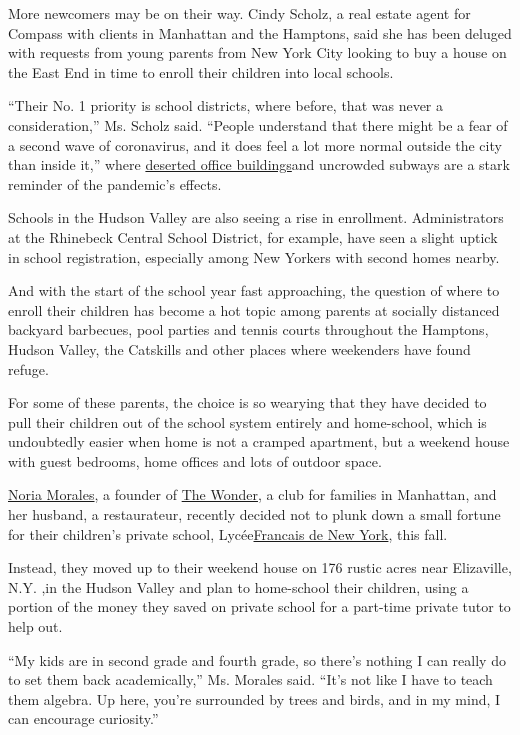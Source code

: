 More newcomers may be on their way. Cindy Scholz, a real estate agent
for Compass with clients in Manhattan and the Hamptons, said she has
been deluged with requests from young parents from New York City looking
to buy a house on the East End in time to enroll their children into
local schools.

``Their No. 1 priority is school districts, where before, that was never
a consideration,'' Ms. Scholz said. ``People understand that there might
be a fear of a second wave of coronavirus, and it does feel a lot more
normal outside the city than inside it,'' where
\href{https://www.nytimes3xbfgragh.onion/2020/07/26/nyregion/nyc-coronavirus-time-life-building.html}{deserted
office buildings}and uncrowded subways are a stark reminder of the
pandemic's effects.

Schools in the Hudson Valley are also seeing a rise in enrollment.
Administrators at the Rhinebeck Central School District, for example,
have seen a slight uptick in school registration, especially among New
Yorkers with second homes nearby.

And with the start of the school year fast approaching, the question of
where to enroll their children has become a hot topic among parents at
socially distanced backyard barbecues, pool parties and tennis courts
throughout the Hamptons, Hudson Valley, the Catskills and other places
where weekenders have found refuge.

For some of these parents, the choice is so wearying that they have
decided to pull their children out of the school system entirely and
home-school, which is undoubtedly easier when home is not a cramped
apartment, but a weekend house with guest bedrooms, home offices and
lots of outdoor space.

\href{https://www.glamour.com/story/noria-morales-what-it-costs-to-be-me}{Noria
Morales}, a founder of \href{https://www.thewonder.us/}{The Wonder}, a
club for families in Manhattan, and her husband, a restaurateur,
recently decided not to plunk down a small fortune for their children's
private school, Lycée\href{https://www.lfny.org/}{Francais de New York},
this fall.

Instead, they moved up to their weekend house on 176 rustic acres near
Elizaville, N.Y. ,in the Hudson Valley and plan to home-school their
children, using a portion of the money they saved on private school for
a part-time private tutor to help out.

``My kids are in second grade and fourth grade, so there's nothing I can
really do to set them back academically,'' Ms. Morales said. ``It's not
like I have to teach them algebra. Up here, you're surrounded by trees
and birds, and in my mind, I can encourage curiosity.''

